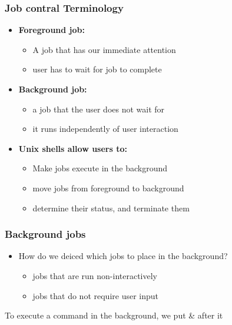 \documentclass{report}
\begin{document}
    \subsubsection{Job contral Terminology}
    \begin{itemize}
        \item \textbf{Foreground job:}
            \begin{itemize}
                \item A job that has our immediate attention
                \item user has to wait for job to complete
            \end{itemize}
        \item \textbf{Background job:}
            \begin{itemize}
                \item a job that the user does not wait for 
                \item it runs independently of user interaction
            \end{itemize}
        \item \textbf{Unix shells allow users to:}
            \begin{itemize}
                \item Make jobs execute in the background
                \item move jobs from foreground to background
                \item determine their status, and terminate them
            \end{itemize}
    \end{itemize}

    \bigbreak \noindent 
    \subsubsection{Background jobs}
    \begin{itemize}
        \item How do we deiced which jobs to place in the background?
            \begin{itemize}
                \item jobs that are run non-interactively 
                \item jobs that do not require user input
            \end{itemize}
    \end{itemize}
    \bigbreak \noindent 
    To execute a command in the background, we put \& after it
\end{document}
